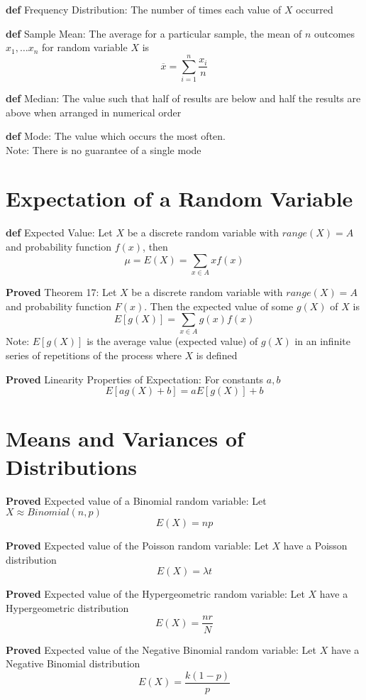 \documentclass[11pt,notitlepage]{report}
\begin{document}
\textbf{def} Frequency Distribution: The number of times each value of $X$ occurred

\textbf{def} Sample Mean: The average for a particular sample, the mean of $n$ outcomes $x_1, \dots x_n$ for random variable $X$ is
$$\overline x = \sum_{i=1}^n \frac{x_i}{n}$$

\textbf{def} Median: The value such that half of results are below and half the results are above when arranged in numerical order

\textbf{def} Mode: The value which occurs the most often. \\
\hspace*{5mm} Note: There is no guarantee of a single mode

\section{Expectation of a Random Variable}

\textbf{def} Expected Value: Let $X$ be a discrete random variable with $range(X) = A$ and probability function $f(x)$, then
$$\mu = E(X) = \sum_{x \in A}xf(x)$$

\textbf{Proved} Theorem 17: Let $X$ be a discrete random variable with $range(X) = A$ and probability function $F(x)$. Then the expected value of some $g(X)$ of $X$ is
$$E[g(X)] = \sum_{x \in A} g(x)f(x)$$
\hspace*{5mm} Note: $E[g(X)]$ is the average value (expected value) of $g(X)$ in an infinite series of repetitions of the process where $X$ is defined

\textbf{Proved} Linearity Properties of Expectation: For constants $a, b$
$$E[ag(X) + b] = aE[g(X)] + b$$



\section{Means and Variances of Distributions}

\textbf{Proved} Expected value of a Binomial random variable: Let $X \approx Binomial(n, p)$
$$E(X) = np$$

\textbf{Proved} Expected value of the Poisson random variable: Let $X$ have a Poisson distribution
$$E(X) = \lambda t$$

\textbf{Proved} Expected value of the Hypergeometric random variable: Let $X$ have a Hypergeometric distribution
$$E(X) = \frac{nr}{N}$$

\textbf{Proved} Expected value of the Negative Binomial random variable: Let $X$ have a Negative Binomial distribution
$$E(X) = \frac{k(1-p)}{p}$$
\end{document}
